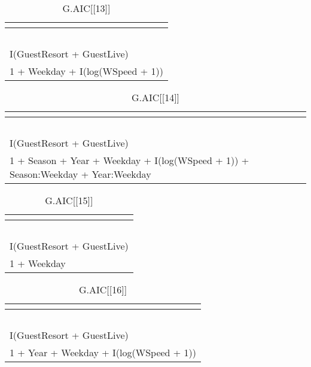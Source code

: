 %
\begin{table}[!tbp]
\caption{G.AIC[[13]]\label{G.AIC[[13]]}} 
\begin{center}
\begin{tabular}{l}
\hline\hline
\multicolumn{1}{c}{}\tabularnewline
\hline
~\tabularnewline
I(GuestResort + GuestLive)\tabularnewline
1 + Weekday + I(log(WSpeed + 1))\tabularnewline
\hline
\end{tabular}
\end{center}
\end{table}

%
\begin{table}[!tbp]
\caption{G.AIC[[14]]\label{G.AIC[[14]]}} 
\begin{center}
\begin{tabular}{l}
\hline\hline
\multicolumn{1}{c}{}\tabularnewline
\hline
~\tabularnewline
I(GuestResort + GuestLive)\tabularnewline
1 + Season + Year + Weekday + I(log(WSpeed + 1)) + Season:Weekday + Year:Weekday\tabularnewline
\hline
\end{tabular}
\end{center}
\end{table}

%
\begin{table}[!tbp]
\caption{G.AIC[[15]]\label{G.AIC[[15]]}} 
\begin{center}
\begin{tabular}{l}
\hline\hline
\multicolumn{1}{c}{}\tabularnewline
\hline
~\tabularnewline
I(GuestResort + GuestLive)\tabularnewline
1 + Weekday\tabularnewline
\hline
\end{tabular}
\end{center}
\end{table}

%
\begin{table}[!tbp]
\caption{G.AIC[[16]]\label{G.AIC[[16]]}} 
\begin{center}
\begin{tabular}{l}
\hline\hline
\multicolumn{1}{c}{}\tabularnewline
\hline
~\tabularnewline
I(GuestResort + GuestLive)\tabularnewline
1 + Year + Weekday + I(log(WSpeed + 1))\tabularnewline
\hline
\end{tabular}
\end{center}
\end{table}

